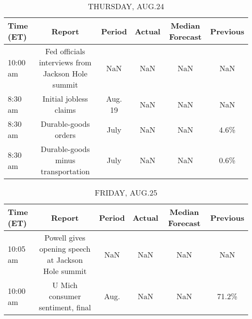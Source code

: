 \documentclass{article}%
\begin{document}
%


\begin{table}[htbp]%
\caption{THURSDAY, AUG.24}%
\centering%
\begin{adjustbox}{width=1\textwidth}%
\begin{tabular}{lccccc}
\toprule
Time (ET) &                                            Report &  Period & Actual & Median Forecast & Previous \\
\midrule
 10:00 am & Fed officials interviews from Jackson Hole summit &     NaN &    NaN &             NaN &      NaN \\
  8:30 am &                            Initial jobless claims & Aug. 19 &    NaN &             NaN &      NaN \\
  8:30 am &                              Durable-goods orders &    July &    NaN &             NaN &     4.6\% \\
  8:30 am &                Durable-goods minus transportation &    July &    NaN &             NaN &     0.6\% \\
\bottomrule
\end{tabular}
%
\end{adjustbox}%
\end{table}

%


\begin{table}[htbp]%
\caption{FRIDAY, AUG.25}%
\centering%
\begin{adjustbox}{width=1\textwidth}%
\begin{tabular}{lccccc}
\toprule
Time (ET) &                                             Report & Period & Actual & Median Forecast & Previous \\
\midrule
 10:05 am & Powell gives opening speech at Jackson Hole summit &    NaN &    NaN &             NaN &      NaN \\
 10:00 am &                   U Mich consumer sentiment, final &   Aug. &    NaN &             NaN &    71.2\% \\
\bottomrule
\end{tabular}
%
\end{adjustbox}%
\end{table}
\end{document}
